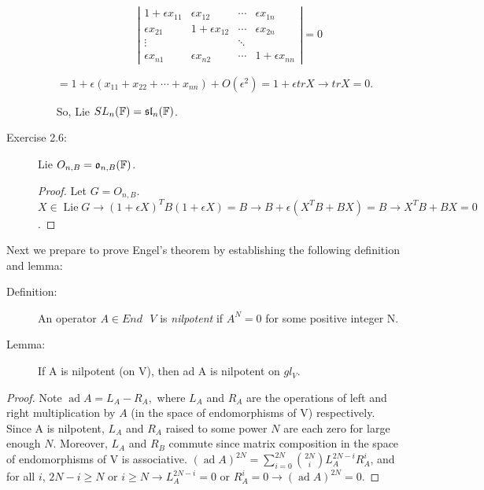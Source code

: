\documentclass[aps,onecolumn,secnumarabic,nobalancelastpage,amsmath,amssymb]{revtex4}
\DeclareMathOperator{\ad}{ad}
\DeclareMathOperator{\Lie}{Lie}
\begin{document}
\begin{description}
\begin{enumerate}
\[ \left| \begin{array}{cccc}
1 + \epsilon x_{11} & \epsilon x_{12} & \cdots & \epsilon x_{1n} \\
\epsilon x_{21} & 1 + \epsilon x_{12} & \cdots & \epsilon x_{2n} \\
\vdots & & \ddots & \\
\epsilon x_{n1} & \epsilon x_{n2} & \cdots & 1 + \epsilon x_{nn} \end{array} \right| = 0 \] 

$ = 1 + \epsilon (x_{11} + x_{22} + \cdots + x_{nn}) + O(\epsilon^2)
= 1 + \epsilon tr X \rightarrow tr X = 0$. 

So, Lie $SL_n(\mathbb{F}) = \mathfrak{sl}_n(\mathbb{F})$. 
\end{enumerate}
\item[Exercise 2.6:] Lie $O_{n,B} = \mathfrak{o}_{n,B}(\mathbb{F})$. 
\begin{proof}
Let $G = O_{n,B}$.  $X \in \Lie G \rightarrow (1+\epsilon X)^T B (1+\epsilon X) = B \rightarrow B + \epsilon(X^T B + B X) = B \rightarrow X^T B + B X = 0$.
\end{proof}
\end{description}
Next we prepare to prove Engel's theorem by establishing the following definition and lemma: 
\begin{description}
\item[Definition:] An operator $A \in End\text{ }V$ is {\slshape nilpotent} if $A^N = 0$ for some positive integer N. 
\item[Lemma:] If A is nilpotent (on V), then ad A is nilpotent on $gl_V$. 
\end{description}
\begin{proof}
Note $\ad A = L_A - R_A,$ where $L_A$ and $R_A$ are the operations of left and right multiplication by $A$ (in the space of endomorphisms of V) respectively. Since A is nilpotent, $L_A$ and $R_A$ raised to some power $N$ are each zero for large enough $N$.  Moreover, $L_A$ and $R_B$ commute since matrix composition in the space of endomorphisms of V is associative. $ (\ad A)^{2N} = \sum_{i=0}^{2N} {2N \choose i} L_A^{2N-i} R_A^i$, and for all $i$, $2N-i \ge N$ or $i \ge N \rightarrow L_A^{2N-i} = 0$ or $R_A^i = 0 \rightarrow (\ad A)^{2N} = 0$. 
\end{proof}
\end{document}
